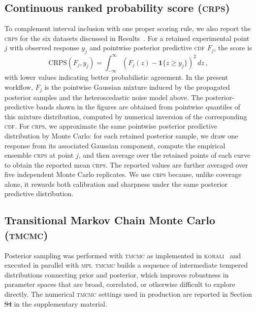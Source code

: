 \documentclass[%
 aip,
 jcp,
 amsmath,amssymb,
 preprint,%
]{revtex4-1}
\makeatletter
\providecommand{\DIFadd}[1]{{\protect\color{blue}\uwave{#1}}} %
\providecommand{\DIFdel}[1]{{\protect\color{red}\sout{#1}}} %
\providecommand{\DIFaddbegin}{} %
\providecommand{\DIFaddend}{} %
\providecommand{\DIFdelbegin}{} %
\providecommand{\DIFdelend}{} %
\let\sout@orig\sout %
\renewcommand{\sout}[1]{\ifmmode\text{\sout@orig{\ensuremath{#1}}}\else\sout@orig{#1}\fi} %
\makeatother
\begin{document}
\subsection{Continuous ranked probability score (\textsc{crps})}
\label{sec:meth:crps}

\noindent To complement interval inclusion with one proper scoring rule, we also report the \textsc{crps} for the six datasets discussed in Results~\citep{gneiting2007strictly,gneiting2007probabilistic,hersbach2000decomposition}. For a retained experimental point $j$ with observed response $y_j$ and pointwise posterior predictive \textsc{cdf} $F_j$, the score is
\begin{equation}
\mathrm{CRPS}(F_j,y_j)=\int_{-\infty}^{\infty}\left(F_j(z)-\mathbf{1}\{z\ge y_j\}\right)^2\,dz \, ,
\end{equation}
with lower values indicating better probabilistic agreement. In the present workflow, $F_j$ is the pointwise Gaussian mixture induced by the propagated posterior samples and the heteroscedastic noise model above. The posterior-predictive bands shown in the figures are obtained from pointwise quantiles of this mixture distribution, computed by numerical inversion of the corresponding \textsc{cdf}. For \textsc{crps}, we approximate the same pointwise posterior predictive distribution by Monte Carlo: for each retained posterior sample, we draw one response from its associated Gaussian component, compute the empirical ensemble \textsc{crps} at point $j$, and then average over the retained points of each curve to obtain the reported mean \textsc{crps}. The reported values are further averaged over five independent Monte Carlo replicates. We use \textsc{crps} because, unlike coverage alone, it rewards both calibration and sharpness under the same posterior predictive distribution.

\subsection{Transitional Markov Chain Monte Carlo (\textsc{tmcmc})}
\label{sec:meth:tmcmc}

\noindent Posterior sampling was performed with \textsc{tmcmc} as implemented in \textsc{korali}~\citep{martin2022korali} and executed in parallel with \textsc{mpi}. \textsc{tmcmc} builds a sequence of intermediate tempered distributions connecting prior and posterior, which improves robustness in parameter spaces that are broad, correlated, or otherwise difficult to explore directly. The numerical \textsc{tmcmc} settings used in production are reported in Section \DIFdelbegin \DIFdel{S4 }\DIFdelend \DIFaddbegin \DIFadd{S6 }\DIFaddend in the supplementary material.
\end{document}
